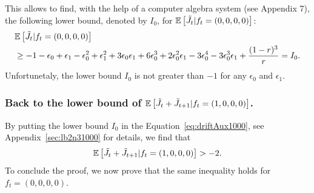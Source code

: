 \documentclass[11pt]{article}
\theoremstyle{plain}
\theoremstyle{definition}
\theoremstyle{remark}
\newcommand{\esp}[1]{\mathbb{E}\left[ #1 \right]}
\begin{document}
This allows to find, with the help of a computer algebra system (see Appendix 7), the following lower bound, denoted by $I_0$, for $\esp{\Tilde{J}_t | f_t=(0,0,0,0)}$:
\begin{align}
&\esp{\Tilde{J}_t|f_t=(0,0,0,0)} \nonumber \\
&\geq -1-\epsilon_0+\epsilon_1-\epsilon_0^2+\epsilon_1^2+3\epsilon_0\epsilon_1+6\epsilon_0^3 +2\epsilon_0^2\epsilon_1-3\epsilon_0^{4}-3\epsilon_0^3\epsilon_1+\frac{(1-r)^{3}}{r} = I_0. \label{eq:I0}
\end{align}
Unfortunetaly, the lower bound $I_0$ is not greater than $-1$ for any $\epsilon_0$ and $\epsilon_1$. 

\subsubsection{Back to the lower bound of  $\esp{\Tilde{J}_t + \Tilde{J}_{t+1} | f_t = (1,0,0,0)}$.}
By putting the lower bound $I_0$ in the Equation~\eqref{eq:driftAux1000}, see Appendix~\ref{sec:lb2n31000} for details, we find that
\begin{equation} \label{eq:-21000}
\esp{\Tilde{J}_t + \Tilde{J}_{t+1} | f_t = (1,0,0,0)} > -2.
\end{equation}
To conclude the proof,  we now prove that the same inequality holds for $f_t = (0,0,0,0)$.
\end{document}
